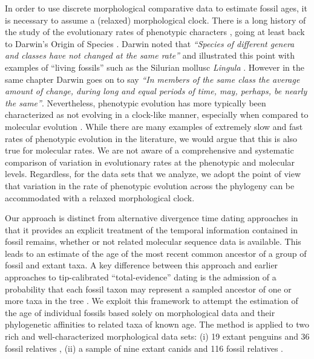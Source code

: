 \documentclass[11pt]{article}
\newcommand{\ncanidfossils}{{116}}
\begin{document}
In order to use discrete morphological comparative data to estimate fossil ages, it is necessary to assume a (relaxed) morphological clock. There is a long history of the study of the evolutionary rates of phenotypic characters \cite{Simpson1944,Haldane1949,Simpson1953,Gingerich1983,Gingerich1993}, going at least back to Darwin's Origin of Species \cite{Darwin1859}. Darwin noted that {\it ``Species of different genera and classes have not changed at the same rate''} and illustrated this point with examples of ``living fossils'' such as the Silurian mollusc {\it Lingula} \cite{Darwin1859}. However in the same chapter Darwin goes on to say {\it ``In members of the same class the average amount of change, during long and equal periods of time, may, perhaps, be nearly the same''}. Nevertheless, phenotypic evolution has more typically been characterized as not evolving in a clock-like manner, especially when compared to molecular evolution \cite{Kimura1983}. While there are many examples of extremely slow and fast rates of phenotypic evolution in the literature, we would argue that this is also true for molecular rates. We are not aware of a comprehensive and systematic comparison of variation in evolutionary rates at the phenotypic and molecular levels. Regardless, for the data sets that we analyze, we adopt the point of view that variation in the rate of phenotypic evolution across the phylogeny can be accommodated with a relaxed morphological clock.

Our approach is distinct from alternative divergence time dating approaches in that it provides an explicit treatment of the temporal information contained in fossil remains, whether or not related molecular sequence data is available. 
This leads to an estimate of the age of the most recent common ancestor of a group of fossil and extant taxa. A key difference between this approach and earlier approaches to tip-calibrated ``total-evidence'' dating \cite{Ronq2012} is the admission of a probability that each fossil taxon may represent a sampled ancestor of one or more taxa  in the tree \cite{gavr2014}.
We exploit this framework to attempt the estimation of the age of individual fossils based solely on morphological data and their phylogenetic affinities to related taxa of known age. 
The method is applied to two rich and well-characterized morphological data sets: (i) 
19 extant penguins and 36 fossil relatives \cite{ksepka2010,ksepka2012}, (ii) a sample of nine extant canids and \ncanidfossils{} fossil relatives \cite{Slater2015}.
\end{document}
